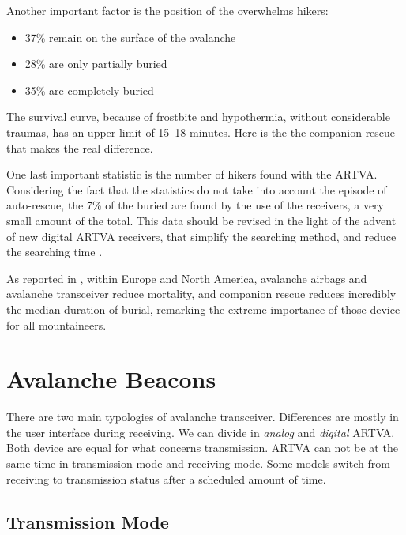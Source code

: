 Another important factor is the position of the overwhelms hikers:
\begin{itemize}
\item 37\% remain on the surface of the avalanche
\item 28\% are only partially buried
\item 35\% are completely buried
\end{itemize}

The survival curve, because of frostbite and hypothermia, without considerable traumas, has an upper limit of 15--18 minutes. Here is the the companion rescue that makes the real difference\cite{ManualeSciAlpinismo}.

One last important statistic is the number of hikers found with the ARTVA. Considering the fact that the statistics do not take into account the episode of auto-rescue, the 7\% of the buried are found by the use of the receivers, a very small amount of the total. This data should be revised in the light of the advent of new digital ARTVA receivers, that simplify the searching method, and reduce the searching time \citep{hereforddigital}. 

As reported in \citep{Brugger2007}, within Europe and North America, avalanche airbags and avalanche transceiver reduce mortality, and companion rescue reduces incredibly the median duration of burial, remarking the extreme importance of those device for all mountaineers.

\section{Avalanche Beacons}

There are two main typologies of avalanche transceiver. Differences are mostly in the user interface during receiving. We can divide in \emph{analog} and \emph{digital} ARTVA. Both device are equal for what concerns transmission. ARTVA can not be at the same time in transmission mode and receiving mode. Some models switch from receiving to transmission status after a scheduled amount of time. 

\subsection{Transmission Mode}

